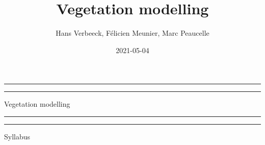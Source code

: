 \documentclass[12pt,oneside]{book}
\title{Vegetation modelling}
\author{Hans Verbeeck, Félicien Meunier, Marc Peaucelle}
\date{2021-05-04}
\begin{document}
\maketitle

\newcommand{\plogo}{\fbox{$\mathcal{PL}$}} %
\frontmatter


\begin{titlepage} %

	\centering %
	
	\scshape %
	
	\vspace*{\baselineskip} %
	
	
	\vspace{12\baselineskip}
	
	\rule{\textwidth}{1.6pt}\vspace*{-\baselineskip}\vspace*{2pt} %
	\rule{\textwidth}{0.4pt} %
	
	\vspace{0.75\baselineskip} %
	
	{\LARGE Vegetation modelling\\} %
	
	\vspace{0.75\baselineskip} %
	
	\rule{\textwidth}{0.4pt}\vspace*{-\baselineskip}\vspace{3.2pt} %
	\rule{\textwidth}{1.6pt} %
	
	\vspace{2\baselineskip} %
	
	
	Syllabus %
	
	\vspace*{3\baselineskip} %
	
	

\end{titlepage}
\end{document}
